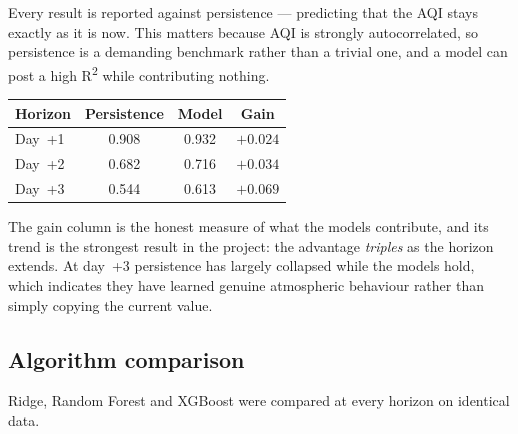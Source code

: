 \documentclass[11pt,a4paper]{article}
\begin{document}
Every result is reported against persistence --- predicting that the AQI
stays exactly as it is now. This matters because AQI is strongly
autocorrelated, so persistence is a demanding benchmark rather than a
trivial one, and a model can post a high R\textsuperscript{2} while
contributing nothing.

\begin{center}
\begin{tabular}{lccc}
\toprule
\textbf{Horizon} & \textbf{Persistence} & \textbf{Model} & \textbf{Gain} \\
\midrule
Day~+1 & 0.908 & 0.932 & $+0.024$ \\
Day~+2 & 0.682 & 0.716 & $+0.034$ \\
Day~+3 & 0.544 & 0.613 & $+0.069$ \\
\bottomrule
\end{tabular}
\end{center}

The gain column is the honest measure of what the models contribute, and
its trend is the strongest result in the project: the advantage
\emph{triples} as the horizon extends. At day~+3 persistence has largely
collapsed while the models hold, which indicates they have learned
genuine atmospheric behaviour rather than simply copying the current
value.

\subsection{Algorithm comparison}

Ridge, Random Forest and XGBoost were compared at every horizon on
identical data.
\end{document}

